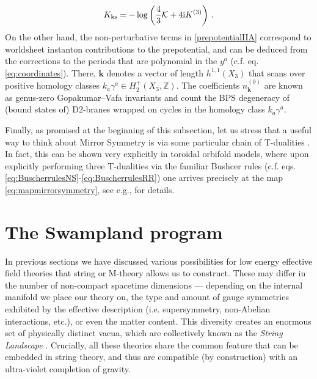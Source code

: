 %
\begin{align}\label{eq:alpha'correctedKahlerpot}
 K_{\rm ks}=- \log \left(\frac{4}{3}\mathcal{K} +4 \text{i} K^{(3)}\right)\, .
\end{align}
%
On the other hand, the non-perturbative terms in \eqref{prepotentialIIA} correspond to worldsheet instanton contributions to the prepotential, and can be deduced from the corrections to the periods that are polynomial in the $y^a$ (c.f. eq. \eqref{eq:coordinates}). There, $\boldsymbol{k}$ denotes a vector of length $h^{1,1}(X_3)$ that scans over positive homology classes $k_a\gamma^a \in H_2^+(X_3,\mathbb{Z})$. The coefficients $n_{\boldsymbol{k}}^{(0)}$ are known as genus-zero Gopakumar--Vafa invariants and count the BPS degeneracy of (bound states of) D2-branes wrapped on cycles in the homology class $k_a \gamma^a$\cite{Gopakumar:1998ii, Gopakumar:1998jq}.

Finally, as promised at the beginning of this subsection, let us stress that a useful way to think about Mirror Symmetry is via some particular chain of T-dualities \cite{Strominger:1996it}. In fact, this can be shown very explicitly in toroidal orbifold models, where upon explicitly performing three T-dualities via the familiar Bushcer rules (c.f. eqs. \eqref{eq:BuscherrulesNS}-\eqref{eq:BuscherrulesRR}) one arrives precisely at the map \eqref{eq:mapmirrorsymmetry}, see e.g., \cite{Ibanez:2012zz} for details. 

\section{The Swampland program} \label{s:SwamplandProgram}

In previous sections we have discussed various possibilities for low energy effective field theories that string or M-theory allows us to construct. These may differ in the number of non-compact spacetime dimensions --- depending on the internal manifold we place our theory on, the type and amount of gauge symmetries exhibited by the effective description (i.e. supersymmetry, non-Abelian interactions, etc.), or even the matter content. This diversity creates an enormous set of physically distinct vacua, which are collectively known as the \emph{String Landscape} \cite{Susskind:2003kw}. Crucially, all these theories share the common feature that can be embedded in string theory, and thus are compatible (by construction) with an ultra-violet completion of gravity. 


